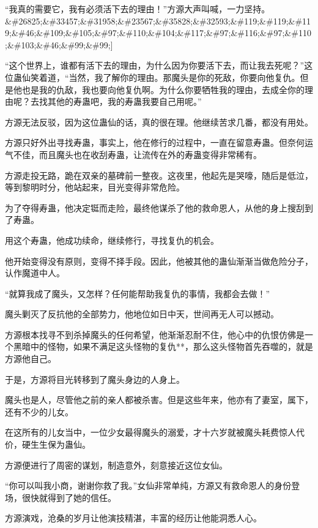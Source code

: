 
\begin{this_body}

“我真的需要它，我有必须活下去的理由！”方源大声叫喊，一力坚持。\&\#26825;\&\#33457;\&\#31958;\&\#23567;\&\#35828;\&\#32593;\&\#119;\&\#119;\&\#119;\&\#46;\&\#109;\&\#105;\&\#97;\&\#110;\&\#104;\&\#117;\&\#97;\&\#116;\&\#97;\&\#110;\&\#103;\&\#46;\&\#99;\&\#99;]

“这个世界上，谁都有活下去的理由，为什么因为你要活下去，而让我去死呢？”这位蛊仙笑着道，“当然，我了解你的理由。那魔头是你的死敌，你要向他复仇。但是他也是我的仇敌，我也要向他复仇啊。为什么你要牺牲我的理由，去成全你的理由呢？去找其他的寿蛊吧，我的寿蛊我要自己用呢。”

方源无法反驳，因为这位蛊仙的话，真的很在理。他继续苦求几番，都没有用处。

方源只好外出寻找寿蛊，事实上，他在修行的过程中，一直在留意寿蛊。但奈何运气不佳，而且魔头也在收刮寿蛊，让流传在外的寿蛊变得非常稀有。

方源走投无路，跪在双亲的墓碑前一整夜。这夜里，他起先是哭嚎，随后是低泣，等到黎明时分，他站起来，目光变得非常危险。

为了夺得寿蛊，他决定铤而走险，最终他谋杀了他的救命恩人，从他的身上搜刮到了寿蛊。

用这个寿蛊，他成功续命，继续修行，寻找复仇的机会。

他开始变得没有原则，变得不择手段。因此，他被其他的蛊仙渐渐当做危险分子，认作魔道中人。

“就算我成了魔头，又怎样？任何能帮助我复仇的事情，我都会去做！”

魔头剿灭了反抗他的全部势力，他地位如日中天，世间再无人可以撼动。

方源根本找寻不到杀掉魔头的任何希望，他渐渐忍耐不住，他心中的仇恨仿佛是一个黑暗中的怪物，如果不满足这头怪物的复仇**，那么这头怪物首先吞噬的，就是方源他自己。

于是，方源将目光转移到了魔头身边的人身上。

魔头也是人，尽管他之前的亲人都被杀害。但是这些年来，他亦有了妻室，属下，还有不少的儿女。

在这所有的儿女当中，一位少女最得魔头的溺爱，才十六岁就被魔头耗费惊人代价，硬生生保为蛊仙。

方源便进行了周密的谋划，制造意外，刻意接近这位女仙。

“你可以叫我小商，谢谢你救了我。”女仙非常单纯，方源又有救命恩人的身份登场，很快就得到了她的信任。

方源演戏，沧桑的岁月让他演技精湛，丰富的经历让他能洞悉人心。


\end{this_body}
